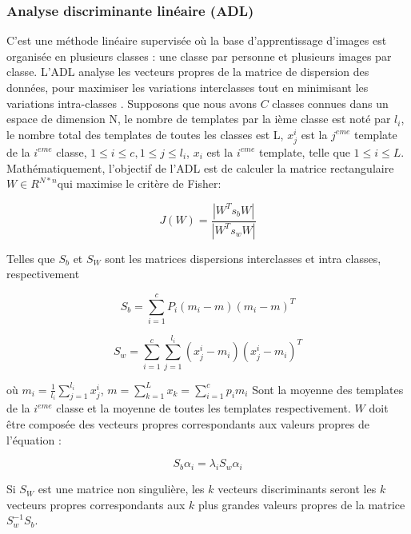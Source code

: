 \subsubsection{Analyse discriminante linéaire (ADL)}
\label{ADL}
C’est une méthode linéaire supervisée où la base d’apprentissage d’images est organisée en plusieurs classes : une classe par personne et plusieurs images par classe. L'ADL analyse les vecteurs propres de la matrice de dispersion des données, pour maximiser les variations interclasses tout en minimisant les variations intra-classes \citep{morizet2006revue}.
Supposons que nous avons $ C $ classes connues dans un espace de dimension N, le nombre de templates par la ième classe est noté par $l_{i}$, le nombre total des templates de toutes les classes est L,
$x_j^i$ est la $j^{eme}$ template de la $i^{eme}$ classe, $1\leq i\leq c,1\leq j\leq l_{i}$, $x_{i}$ est la $i^{eme}$ template, telle que $1\leq i\leq L$.
\\
Mathématiquement, l’objectif de l’ADL est de calculer la matrice rectangulaire $W\in R^{N*n}$qui maximise le critère de Fisher:
\begin{center}
	\begin{equation}\label{eq:chapitre3eq4}
	J(W)=\frac{\left | W^Ts_b W \right |}{\left | W^Ts_w W\right |}
	\end{equation}
\end{center}
Telles que $S_{b}$ et $S_{W}$ sont les matrices dispersions interclasses et intra classes, respectivement
\begin{center}
	\begin{equation}\label{eq:chapitre3eq5}
	S_b=\sum_{i=1}^{c}P_i(m_i -m)(m_i-m)^T
	\end{equation}
\end{center}
\begin{center}
	\begin{equation}\label{eq:chapitre3eq6}
	S_w=\sum_{i=1}^{c}\sum_{j=1}^{l_{i}}(x_{j}^{i}-m_{i})(x_{j}^{i}-m_{i})^{T}
	\end{equation}
\end{center}
où $m_i=\frac{1}{l_i}\sum_{j=1}^{l_i}x_{j}^{i}$, $m=\sum_{k=1}^{L}x_{k}=\sum_{i=1}^{c}p_{i}m_{i}$ Sont la moyenne des templates de la $i^{eme}$ classe et la moyenne de toutes les templates respectivement.
$W$ doit être composée des vecteurs propres correspondants aux valeurs propres de l’équation :
\begin{center}
	\begin{equation}\label{eq:chapitre3eq7}
	S_b \alpha _i=\lambda_i S_w \alpha_i
	\end{equation}
\end{center}
Si $S_{W}$ est une matrice non singulière, les $k$ vecteurs discriminants seront les $k$ vecteurs propres correspondants aux $k$ plus grandes valeurs propres de la matrice $S_{w}^{-1}S_{b}$.
